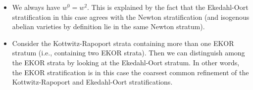 \documentclass[a4paper]{scrartcl} %
\numberwithin{equation}{section}
\begin{document}
\begin{Observations}
  \begin{itemize}
  \item We always have $w^0=w^2$.  This is explained by the fact that the Ekedahl-Oort stratification in this case agrees with the Newton stratification (and isogenous abelian varieties by definition lie in the same Newton stratum).  
  \item Consider the Kottwitz-Rapoport strata containing more than one EKOR stratum (i.e., containing two EKOR strata). Then we can distinguish among the EKOR strata by looking at the Ekedahl-Oort stratum.  In other words, the EKOR stratification is in this case the coarsest common refinement of the Kottwitz-Rapoport and Ekedahl-Oort stratifications.
  \end{itemize}
\end{Observations}






























\nocite{kottwitz,illusie,travaux,haines,zhangEO,zinka,zinkformal,lautrunc,rapo-guide,landvogt-buch,wortmann}


\printbibliography[heading=bibintoc]


%
%
\end{document}
